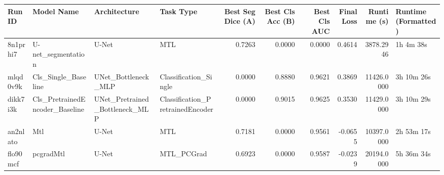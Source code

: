 \begin{tabular}{llllrrrrrl}
\toprule
Run ID & Model Name & Architecture & Task Type & Best Seg Dice (A) & Best Cls Acc (B) & Best Cls AUC & Final Loss & Runtime (s) & Runtime (Formatted) \\
\midrule
8n1prhi7 & U-net_segmentation & U-Net & MTL & 0.7263 & 0.0000 & 0.0000 & 0.4614 & 3878.2946 & 1h 4m 38s \\
mlqd0v9k & Cls_Single_Baseline & UNet_Bottleneck_MLP & Classification_Single & 0.0000 & 0.8880 & 0.9621 & 0.3869 & 11426.0000 & 3h 10m 26s \\
dikk7i3k & Cls_PretrainedEncoder_Baseline & UNet_Pretrained_Bottleneck_MLP & Classification_PretrainedEncoder & 0.0000 & 0.9015 & 0.9625 & 0.3530 & 11429.0000 & 3h 10m 29s \\
an2nlato & Mtl & U-Net & MTL & 0.7181 & 0.0000 & 0.9561 & -0.0655 & 10397.0000 & 2h 53m 17s \\
flo90mcf & pcgradMtl & U-Net & MTL_PCGrad & 0.6923 & 0.0000 & 0.9587 & -0.0239 & 20194.0000 & 5h 36m 34s \\
\bottomrule
\end{tabular}
